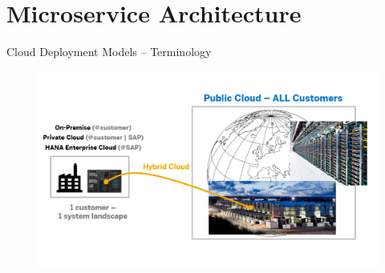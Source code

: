 \part{Microservice Architecture}

\begin{frame}{Cloud Deployment Models – Terminology}
	\begin{figure}
  	\includegraphics[width=1.0\textwidth]{../MicroServiceArchitecture/images/CloudTerminology}
	\end{figure}
\end{frame}


